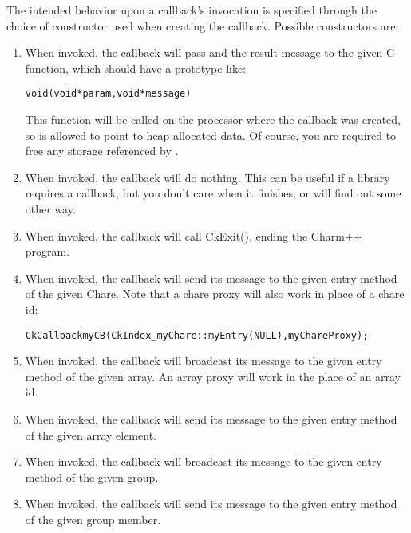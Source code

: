 The intended behavior upon a callback's invocation is specified
through the choice of constructor used when creating the callback. 
Possible constructors are: 

\begin{enumerate}
\item {} When invoked, the
callback will pass  and the result message to the given C function,
which should have a prototype like:

\begin{alltt}
void (void *param,void *message)
\end{alltt}

This function will be called on the processor where the callback was created,
so  is allowed to point to heap-allocated data.  Of course, you
are required to free any storage referenced by .

\item {} When invoked, the callback
will do nothing.  This can be useful if a \charmpp{} library requires a callback,
but you don't care when it finishes, or will find out some other way.

\item {} When invoked, the callback
will call CkExit(), ending the Charm++ program.

\item {} When invoked, the 
callback will send its message to the given entry method of the given
Chare.  Note that a chare proxy will also work in place of a chare id:

\begin{alltt}
	CkCallback myCB(CkIndex_myChare::myEntry(NULL),myChareProxy);
\end{alltt}

\item {} 
When invoked,
the callback will broadcast its message to the given entry method
of the given array.  An array proxy will work in the place of an array id.

\item {}
When invoked,
the callback will send its message to the given entry method
of the given array element. 

\item {} 
When invoked,
the callback will broadcast its message to the given entry method
of the given group.

\item {}
When invoked,
the callback will send its message to the given entry method
of the given group member. 

\end{enumerate}


